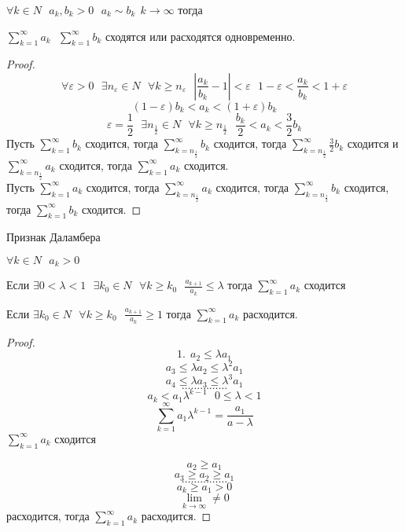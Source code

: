 \begin{block}
  $\forall k \in N ~~~ a_k, b_k > 0 ~~~ a_k \sim b_k ~~ k \to \infty$ тогда

  $\sum_{k=1}^{\infty} a_k ~~~ \sum_{k=1}^{\infty} b_k$
  сходятся или расходятся одновременно.
\end{block}

\begin{proof}
  $$
  \forall \varepsilon > 0 ~~~ \exists n_{\varepsilon} \in N ~~~
  \forall k \ge n_{\varepsilon} ~~~
  \left| \frac{a_k}{b_k} -1 \right| < \varepsilon ~~~
  1 - \varepsilon < \frac{a_k}{b_k} < 1 + \varepsilon
  $$
  $$
  (1 - \varepsilon)b_k < a_k < (1 + \varepsilon)b_k
  $$
  $$
  \varepsilon = \frac{1}{2} ~~~
  \exists n_{\frac{1}{2}} \in N ~~~
  \forall k \ge n_{\frac{1}{2}} ~~~
  \frac{b_k}{2} < a_k < \frac{3}{2} b_k
  $$
  Пусть $\sum_{k=1}^{\infty} b_k$ сходится, тогда
  $\sum_{k=n_{\frac{1}{2}}}^{\infty} b_k$ сходится, тогда
  $\sum_{k=n_{\frac{1}{2}}}^{\infty} \frac{3}{2} b_k$ сходится и
  $\sum_{k=n_{\frac{1}{2}}}^{\infty} a_k$ сходится, тогда
  $\sum_{k=1}^{\infty} a_k$ сходится.\\

  Пусть $\sum_{k=1}^{\infty} a_k$ сходится, тогда
  $\sum_{k=n_{\frac{1}{2}}}^{\infty} a_k$ сходится, тогда
  $\sum_{k=n_{\frac{1}{2}}}^{\infty} b_k$ сходится, тогда
  $\sum_{k=1}^{\infty} b_k$ сходится.
\end{proof}

\begin{title}
  Признак Даламбера
\end{title}
\begin{block}
  $\forall k \in N ~~~ a_k > 0$

  Если $\exists 0 < \lambda < 1 ~~~ \exists k_0 \in N ~~~ \forall k \ge k_0 ~~~
  \frac{a_{k+1}}{a_k} \le \lambda$ тогда $\sum_{k=1}^{\infty} a_k$ сходится

  Если $\exists k_0 \in N ~~~ \forall k \ge k_0 ~~~ \frac{a_{k+1}}{a_k} \ge 1$
  тогда $\sum_{k=1}^{\infty} a_k$ расходится.
\end{block}

\begin{proof}
  $$
  1. ~~ a_2 \le \lambda a_1
  $$
  $$
  a_3 \le \lambda a_2 \le \lambda^2 a_1
  $$
  $$
  a_4 \le \lambda a_3 \le \lambda^3 a_1
  $$
  $$
  \ldots \ldots \ldots \ldots \ldots
  $$
  $$
  a_k < a_1 \lambda^{k-1} ~~~ 0 \le \lambda < 1
  $$
  $$
  \sum_{k=1}^{\infty} a_1 \lambda^{k-1} = \frac{a_1}{a-\lambda}
  $$
  $\sum_{k=1}^{\infty} a_k$ сходится

  $$
  a_2 \ge a_1
  $$
  $$
  a_3 \ge a_2 \ge a_1
  $$
  $$
  \ldots \ldots \ldots \ldots \ldots
  $$
  $$
  a_k \ge a_1 > 0
  $$
  $$
  \lim_{k \to \infty} \not= 0
  $$
  расходится, тогда $\sum_{k=1}^{\infty} a_k$ расходится.
\end{proof}

